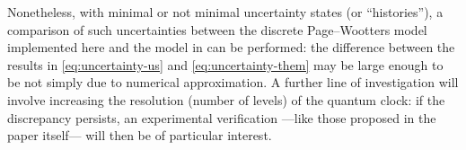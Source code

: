 \citereset
Nonetheless, with minimal or not minimal uncertainty states (or ``histories''),
a comparison of such uncertainties between the discrete Page--Wootters model implemented
here and the model in \cite{RuschhauptAbsorption} can be performed:
the difference between the results in \eqref{eq:uncertainty-us}
and \eqref{eq:uncertainty-them} may be large enough to be not simply
due to numerical approximation. A further line of investigation
will involve increasing the resolution (number of levels) of the quantum clock:
if the discrepancy persists, an experimental verification
---like those proposed in the paper itself---
will then be of
particular interest.
